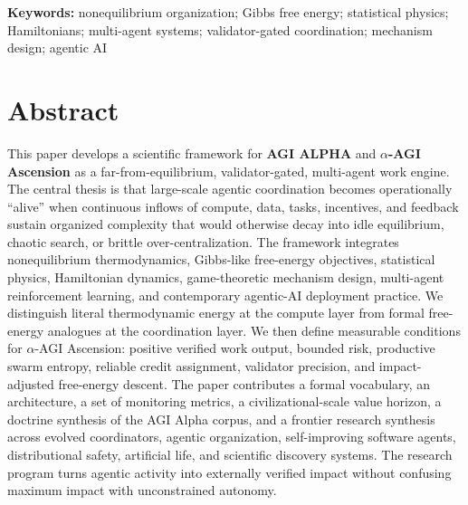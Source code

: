 \documentclass[
  11pt,
]{article}
\begin{document}
\begin{titlepage}
\begin{tcolorbox}[enhanced, width=0.86\textwidth, colback=white, colframe=AgiBlue!32, boxrule=0.75pt, arc=4pt, left=20pt, right=20pt, top=18pt, bottom=18pt]
\begin{tcolorbox}[enhanced, width=0.92\linewidth, colback=white, colframe=AgiBlue!18, boxrule=0.45pt, arc=2pt, left=8pt, right=8pt, top=6pt, bottom=6pt]
\raggedright\small \textbf{Keywords:} nonequilibrium organization; Gibbs free energy; statistical physics; Hamiltonians; multi-agent systems; validator-gated coordination; mechanism design; agentic AI
\end{tcolorbox}
\end{tcolorbox}
\vfill
{}
\end{titlepage}




\section{Abstract}\label{abstract}

This paper develops a scientific framework for \textbf{AGI ALPHA} and
\textbf{$\alpha$-AGI Ascension} as a far-from-equilibrium, validator-gated,
multi-agent work engine. The central thesis is that large-scale agentic
coordination becomes operationally ``alive'' when continuous inflows of
compute, data, tasks, incentives, and feedback sustain organized
complexity that would otherwise decay into idle equilibrium, chaotic
search, or brittle over-centralization. The framework integrates
nonequilibrium thermodynamics, Gibbs-like free-energy objectives,
statistical physics, Hamiltonian dynamics, game-theoretic mechanism
design, multi-agent reinforcement learning, and contemporary agentic-AI
deployment practice. We distinguish literal thermodynamic energy at the
compute layer from formal free-energy analogues at the coordination
layer. We then define measurable conditions for $\alpha$-AGI Ascension:
positive verified work output, bounded risk, productive swarm entropy,
reliable credit assignment, validator precision, and impact-adjusted
free-energy descent. The paper contributes a formal vocabulary, an
architecture, a set of monitoring metrics, a civilizational-scale value
horizon, a doctrine synthesis of the AGI Alpha corpus, and a frontier
research synthesis across evolved coordinators, agentic organization,
self-improving software agents, distributional safety, artificial life,
and scientific discovery systems. The research program turns agentic
activity into externally verified impact without confusing maximum
impact with unconstrained autonomy.
\end{document}
